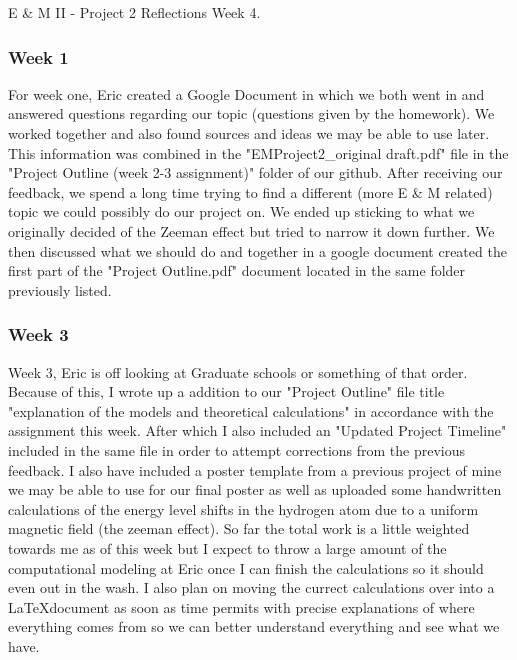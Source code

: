 \documentclass[11pt]{article}
\begin{document}
 

\begin{center}
	{\Large E \& M II - Project 2 Reflections Week 4.}
\end{center}

\subsubsection*{Week 1}

For week one, Eric created a Google Document in which we both went in and answered questions regarding our topic (questions given by the homework). We worked together and also found sources and ideas we may be able to use later. This information was combined in the "EMProject2\_original draft.pdf" file in the "Project Outline (week 2-3 assignment)" folder of our github. After receiving our feedback, we spend a long time trying to find a different (more E \& M related) topic we could possibly do our project on. We ended up sticking to what we originally decided of the Zeeman effect but tried to narrow it down further. We then discussed what we should do and together in a google document created the first part of the "Project Outline.pdf" document located in the same folder previously listed. 

\subsubsection*{Week 3}

Week 3, Eric is off looking at Graduate schools or something of that order. Because of this, I wrote up a addition to our "Project Outline" file title "explanation of the models and theoretical calculations" in accordance with the assignment this week. After which I also included an "Updated Project Timeline" included in the same file in order to attempt corrections from the previous feedback. I also have included a poster template from a previous project of mine we may be able to use for our final poster as well as uploaded some handwritten calculations of the energy level shifts in the hydrogen atom due to a uniform magnetic field (the zeeman effect). So far the total work is a little weighted towards me as of this week but I expect to throw a large amount of the computational modeling at Eric once I can finish the calculations so it should even out in the wash. I also plan on moving the currect calculations over into a \LaTeX  document as soon as time permits with precise explanations of where everything comes from so we can better understand everything and see what we have.
\end{document}
